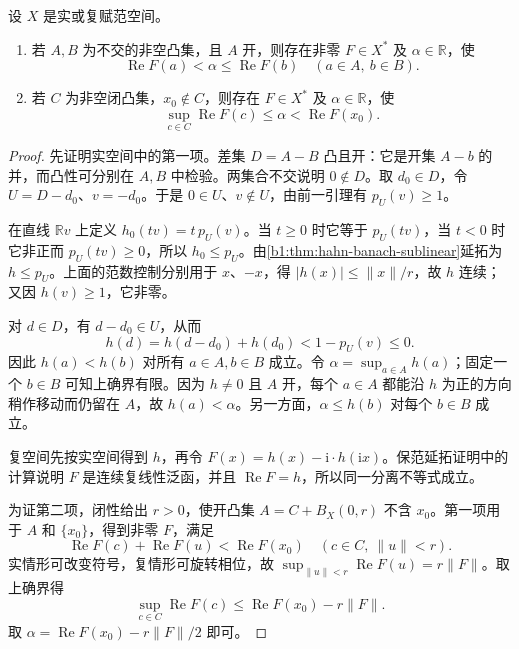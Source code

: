 \begin{theorem}\label{b1:thm:geometric-hahn-banach}
设 \(X\) 是实或复赋范空间。
\begin{enumerate}
\item\label{b1:item:separation-open} 若 \(A,B\) 为不交的非空凸集，且 \(A\) 开，则存在非零 \(F\in X^*\) 及 \(\alpha\in\mathbb R\)，使
\[
\operatorname{Re}F(a)<\alpha\leq\operatorname{Re}F(b)
\quad(a\in A,\ b\in B).
\]
\item\label{b1:item:separation-point-closed} 若 \(C\) 为非空闭凸集，\(x_0\notin C\)，则存在 \(F\in X^*\) 及 \(\alpha\in\mathbb R\)，使
\[
\sup_{c\in C}\operatorname{Re}F(c)\leq\alpha
<\operatorname{Re}F(x_0).
\]
\end{enumerate}
\end{theorem}
\begin{proof}
先证明实空间中的第一项。差集 \(D=A-B\) 凸且开：它是开集 \(A-b\) 的并，而凸性可分别在 \(A,B\) 中检验。两集合不交说明 \(0\notin D\)。取 \(d_0\in D\)，令 \(U=D-d_0\)、\(v=-d_0\)。于是 \(0\in U\)、\(v\notin U\)，由前一引理有 \(p_U(v)\geq1\)。

在直线 \(\mathbb Rv\) 上定义 \(h_0(tv)=t\,p_U(v)\)。当 \(t\geq0\) 时它等于 \(p_U(tv)\)，当 \(t<0\) 时它非正而 \(p_U(tv)\geq0\)，所以 \(h_0\leq p_U\)。由\cref{b1:thm:hahn-banach-sublinear}延拓为 \(h\leq p_U\)。上面的范数控制分别用于 \(x\)、\(-x\)，得 \(|h(x)|\leq\|x\|/r\)，故 \(h\) 连续；又因 \(h(v)\geq1\)，它非零。

对 \(d\in D\)，有 \(d-d_0\in U\)，从而
\[
h(d)=h(d-d_0)+h(d_0)<1-p_U(v)\leq0.
\]
因此 \(h(a)<h(b)\) 对所有 \(a\in A,b\in B\) 成立。令 \(\alpha=\sup_{a\in A}h(a)\)；固定一个 \(b\in B\) 可知上确界有限。因为 \(h\ne0\) 且 \(A\) 开，每个 \(a\in A\) 都能沿 \(h\) 为正的方向稍作移动而仍留在 \(A\)，故 \(h(a)<\alpha\)。另一方面，\(\alpha\leq h(b)\) 对每个 \(b\in B\) 成立。

复空间先按实空间得到 \(h\)，再令 \(F(x)=h(x)-\mathrm i\cdot h(\mathrm ix)\)。保范延拓证明中的计算说明 \(F\) 是连续复线性泛函，并且 \(\operatorname{Re}F=h\)，所以同一分离不等式成立。

为证第二项，闭性给出 \(r>0\)，使开凸集 \(A=C+B_X(0,r)\) 不含 \(x_0\)。第一项用于 \(A\) 和 \(\{x_0\}\)，得到非零 \(F\)，满足
\[
\operatorname{Re}F(c)+\operatorname{Re}F(u)
<\operatorname{Re}F(x_0)
\quad(c\in C,\ \|u\|<r).
\]
实情形可改变符号，复情形可旋转相位，故
\(\sup_{\|u\|<r}\operatorname{Re}F(u)=r\|F\|\)。取上确界得
\[
\sup_{c\in C}\operatorname{Re}F(c)
\leq\operatorname{Re}F(x_0)-r\|F\|.
\]
取 \(\alpha=\operatorname{Re}F(x_0)-r\|F\|/2\) 即可。
\end{proof}

